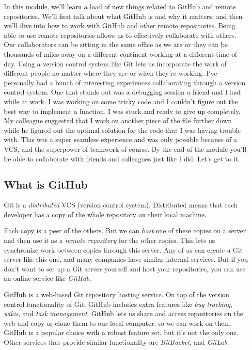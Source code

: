 	In this module, we'll learn a load of new things related to GitHub and remote repositories. We'll first talk about what GitHub is and why it matters, and then we'll dive into how to work with GitHub and other remote repositories. Being able to use remote repositories allows us to effectively collaborate with others. Our collaborators can be sitting in the same office as we are or they can be thousands of miles away on a different continent working at a different time of day. Using a version control system like Git lets us incorporate the work of different people no matter where they are or when they're working. I've personally had a bunch of interesting experiences collaborating through a version control system. One that stands out was a debugging session a friend and I had while at work. I was working on some tricky code and I couldn't figure out the best way to implement a function. I was stuck and ready to give up completely. My colleague suggested that I work on another piece of the file further down while he figured out the optimal solution for the code that I was having trouble with. This was a super seamless experience and was only possible because of a VCS, and the superpower of teamwork of course. By the end of the module you'll be able to collaborate with friends and colleagues just like I did. Let's get to it.

	\subsection{What is GitHub} \label{W301b}

	Git is a \textit{distributed} VCS (version control system). Distributed means that each developer has a copy of the whole repository on their local machine.
	
	Each copy is a peer of the others. But we can \textit{host} one of these copies on a server and then use it as a \textit{remote repository} for the other copies. This lets us synchronize work between copies through this server. Any of us can create a Git server like this one, and many companies have similar internal services. But if you don't want to set up a Git server yourself and host your repositories, you can use an online service like \textit{GitHub}.
	
	GitHub is a web-based Git repository hosting service. On top of the version control functionality of Git, GitHub includes extra features like \textit{bug tracking}, \textit{wikis}, and \textit{task management}. GitHub lets us share and access repositories on the web and copy or clone them to our local computer, so we can work on them. GitHub is a popular choice with a robust feature set, but it's not the only one. Other services that provide similar functionality are \textit{BitBucket}, and \textit{GitLab}.
	
